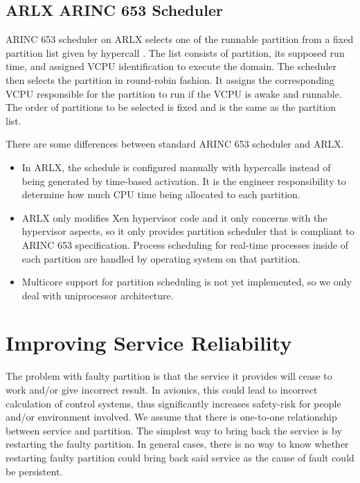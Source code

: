 \documentclass[conference]{IEEEtran}
\begin{document}
\subsection{ARLX ARINC 653 Scheduler}
ARINC 653 scheduler on ARLX selects one of the runnable partition from a fixed partition list
given by hypercall \cite{VanderLeest2010}. The list consists of partition, its supposed run
time, and assigned VCPU identification to execute the domain. The scheduler then selects the
partition in round-robin fashion. It assigns the corresponding VCPU responsible for the
partition to run if the VCPU is awake and runnable. The order of partitions to be selected is
fixed and is the same as the partition list.

There are some differences between standard ARINC 653 scheduler and ARLX.

\begin{itemize}
	\item In ARLX, the schedule is configured manually with hypercalls instead of
		being generated by time-based activation. It is the engineer responsibility to
		determine how much CPU time being allocated to each partition.

	\item ARLX only modifies Xen hypervisor code and it only concerns with the hypervisor
		aspects, so it only provides partition scheduler that is compliant to ARINC 653
		specification. Process scheduling for real-time processes inside of each
		partition are handled by operating system on that partition.

	\item Multicore support for partition scheduling is not yet implemented, so we only deal
		with uniprocessor architecture.
\end{itemize}

\section{Improving Service Reliability}

The problem with faulty partition is that the service it provides will cease to work and/or give
incorrect result. In avionics, this could lead to incorrect calculation of control systems, thus
significantly increases safety-risk for people and/or environment involved. We assume that there
is one-to-one relationship between service and partition. The simplest way to bring back the
service is by restarting the faulty partition. In general cases, there is no way to know whether
restarting faulty partition could bring back said service as the cause of fault could be
persistent.
\end{document}
